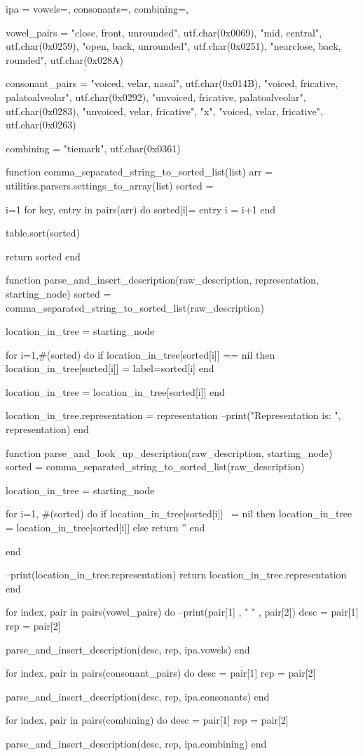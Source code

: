 \startluacode

ipa = {
	vowels={},
	consonants={},
	combining={},
}

vowel_pairs = {
	{ "close, front, unrounded", utf.char(0x0069)},
	{ "mid, central", utf.char(0x0259)},
	{ "open, back, unrounded", utf.char(0x0251)},
	{ "nearclose, back, rounded", utf.char(0x028A)}
}

consonant_pairs = {
	{ "voiced, velar, nasal", utf.char(0x014B)},
	{ "voiced, fricative, palatoalveolar", utf.char(0x0292)},
	{ "unvoiced, fricative, palatoalveolar", utf.char(0x0283)},
	{ "unvoiced, velar, fricative", "x"},
	{ "voiced, velar, fricative", utf.char(0x0263)}
}

combining = {
	{ "tiemark", utf.char(0x0361)}
}

function comma_separated_string_to_sorted_list(list)
	arr = utilities.parsers.settings_to_array(list)
	sorted = {}
	
	i=1
	for key, entry in pairs(arr) do
    		sorted[i]= entry
		i = i+1
	end

	table.sort(sorted)

	return sorted
end

function parse_and_insert_description(raw_description, representation, starting_node) 
	sorted = comma_separated_string_to_sorted_list(raw_description)

	location_in_tree = starting_node

	for i=1,#(sorted) do
		if location_in_tree[sorted[i]] == nil then
			location_in_tree[sorted[i]] = {label=sorted[i]}
		end

		location_in_tree = location_in_tree[sorted[i]]
	end

	location_in_tree.representation = representation
	--print("Representation is: ", representation)
end

function parse_and_look_up_description(raw_description, starting_node)
	sorted = comma_separated_string_to_sorted_list(raw_description)

	location_in_tree = starting_node

	for i=1, #(sorted) do
		if location_in_tree[sorted[i]] ~= nil then
			location_in_tree = location_in_tree[sorted[i]]
		else
			return ''
		end

	end

	--print(location_in_tree.representation)
	return location_in_tree.representation
end

for index, pair in pairs(vowel_pairs) do
	--print(pair[1] , " " , pair[2])
	desc = pair[1]
	rep = pair[2]
	
	parse_and_insert_description(desc, rep, ipa.vowels)
end

for index, pair in pairs(consonant_pairs) do
	desc = pair[1]
	rep = pair[2]

	parse_and_insert_description(desc, rep, ipa.consonants)
end

for index, pair in pairs(combining) do
	desc = pair[1]
	rep = pair[2]

	parse_and_insert_description(desc, rep, ipa.combining)
end


\stopluacode
